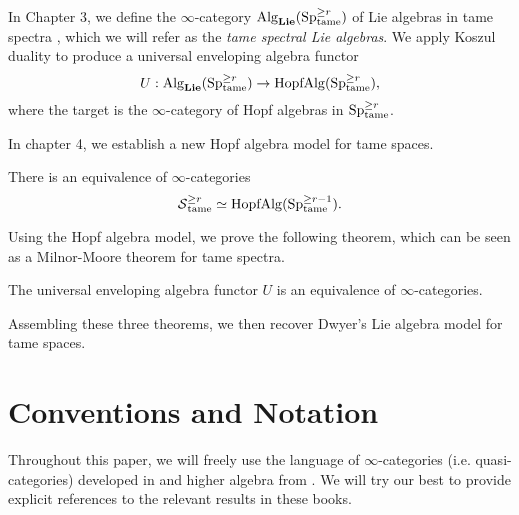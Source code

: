 In Chapter 3, we define the $\infty$-category $\operatorname{Alg}_{\mathbf{Lie}}(\operatorname{Sp}^{\geq r}_{\operatorname{\operatorname{tame}}})$ of Lie algebras in tame spectra , which we will refer as the \emph{tame spectral Lie algebras}.
We apply Koszul duality to produce a universal enveloping algebra functor
$$
U:\operatorname{Alg}_{\mathbf{Lie}}(\operatorname{Sp}^{\geq r}_{\operatorname{\operatorname{tame}}}) \to \operatorname{HopfAlg}(\operatorname{Sp}^{\geq r}_{\operatorname{\operatorname{tame}}}),
$$ 
where the target is the $\infty$-category of Hopf algebras in $\operatorname{Sp}^{\geq r}_{\operatorname{\operatorname{tame}}}$. 

In chapter 4, we establish a new Hopf algebra model for tame spaces.
\begin{thmx}
\label{Theorem C}
There is an equivalence of $\infty$-categories 
$$
\operatorname{\mathcal{S}}^{\geq r}_{\operatorname{\operatorname{tame}}} 
\simeq
\operatorname{HopfAlg}(\operatorname{Sp}^{\geq r-1}_{\operatorname{\operatorname{tame}}}).
$$
\end{thmx}
Using the Hopf algebra model, we prove the following theorem, which can be seen as a Milnor-Moore theorem for tame spectra.
\begin{thmx}
The universal enveloping algebra functor $U$ is an equivalence of $\infty$-categories.
\end{thmx}

Assembling these three theorems, we then recover Dwyer's Lie algebra model for tame spaces.




\section{Conventions and Notation}
Throughout this paper, we will freely use the language of $\infty$-categories (i.e. quasi-categories) developed in \cite{HTT} and higher algebra from \cite{HA}.
We will try our best to provide explicit references to the relevant results in these books.

